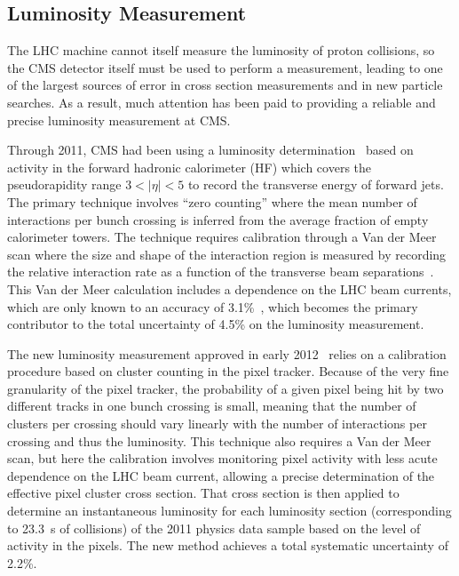 \subsection{Luminosity Measurement}

The LHC machine cannot itself measure the luminosity of proton collisions, so the CMS detector itself must be used to perform a measurement, leading to one of the largest sources of error in cross section measurements and in new particle searches.  As a result, much attention has been paid to providing a reliable and precise luminosity measurement at CMS.  

Through 2011, CMS had been using a luminosity determination~\cite{LUMIPAS} based on activity in the forward hadronic calorimeter (HF) which covers the pseudorapidity range $3 < |\eta| < 5$ to record the transverse energy of forward jets.  The primary technique involves ``zero counting'' where the mean number of interactions per bunch crossing is inferred from the average fraction of empty calorimeter towers.  The technique requires calibration through a Van der Meer scan where the size and shape of the interaction region is measured by recording the relative interaction rate as a function of the transverse beam separations~\cite{vanderMeer:296752}.  This Van der Meer calculation includes a dependence on the LHC beam currents, which are only known to an accuracy of 3.1\%~\cite{Alice:1333997}, which becomes the primary contributor to the total uncertainty of 4.5\% on the luminosity measurement.

The new luminosity measurement approved in early 2012~\cite{CMS-PAS-SMP-12-008} relies on a calibration procedure based on cluster counting in the pixel tracker.  Because of the very fine granularity of the pixel tracker, the probability of a given pixel being hit by two different tracks in one bunch crossing is small, meaning that the number of clusters per crossing should vary linearly with the number of interactions per crossing and thus the luminosity.  This technique also requires a Van der Meer scan, but here the calibration involves monitoring pixel activity with less acute dependence on the LHC beam current, allowing a precise determination of the effective pixel cluster cross section.  That cross section is then applied to determine an instantaneous luminosity for each luminosity section (corresponding to \SI{23.3}{s} of collisions) of the 2011 physics data sample based on the level of activity in the pixels.  The new method achieves a total systematic uncertainty of 2.2\%.

